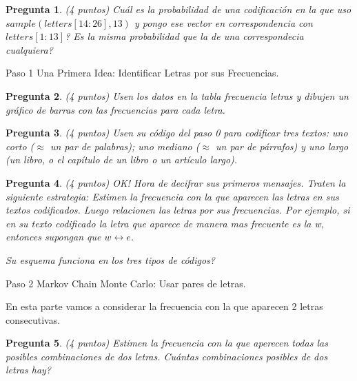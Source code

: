 \documentclass{article}
\newtheorem{pregunta}{Pregunta}
\begin{document}
\begin{pregunta} (4 puntos)
Cu\'al es la probabilidad de una codificaci\'on en la que uso $sample(letters[14:26], 13)$ y pongo ese vector en correspondencia con $letters[1:13]$? Es la misma probabilidad que la de una correspondecia cualquiera?
\end{pregunta}

\begin{topbot}
  \vspace{0.7em}
  Paso 1 \quad Una Primera Idea: Identificar Letras por sus Frecuencias.
  \vspace{0.7em}
\end{topbot}

\begin{pregunta} (4 puntos)
Usen los datos en la tabla frecuencia letras y dibujen un gráfico de barras con las frecuencias para cada letra.
\end{pregunta}

\begin{pregunta} (4 puntos)
Usen su código del paso 0 para codificar tres textos: uno corto ($\approx$ un par de palabras); uno mediano ($\approx$ un par de párrafos) y uno largo (un libro, o el capítulo de un libro o un artículo largo).
\end{pregunta}

\begin{pregunta} (4 puntos)
  OK! Hora de decifrar sus primeros mensajes. Traten la siguiente estrategia:
  Estimen la frecuencia con la que aparecen las letras en sus textos codificados. Luego relacionen las letras por sus frecuencias. Por ejemplo, si en su texto codificado la letra que aparece de manera mas frecuente es la w, entonces supongan que $w \longleftrightarrow e$.

  Su esquema funciona en los tres tipos de c\'odigos?
\end{pregunta}

\begin{topbot}
  \vspace{0.7em}
  Paso 2 \quad Markov Chain Monte Carlo: Usar pares de letras.
  \vspace{0.7em}
\end{topbot}

En esta parte vamos a considerar la frecuencia con la que aparecen 2 letras consecutivas.

\begin{pregunta} (4 puntos)
  Estimen la frecuencia con la que aperecen todas las posibles combinaciones de dos letras. Cu\'antas combinaciones posibles de dos letras hay?
\end{pregunta}
\end{document}
